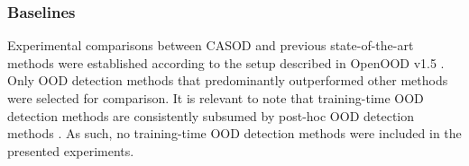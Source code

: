 %
%	
\subsubsection{Baselines}
Experimental comparisons between CASOD and previous state-of-the-art methods were established according to the setup described in OpenOOD v1.5 \cite{zhang2023openood}. Only OOD detection methods that predominantly outperformed other methods were selected for comparison. It is relevant to note that training-time OOD detection methods are consistently subsumed by post-hoc OOD detection methods \cite{zhang2023openood,yang2024generalized}. As such, no training-time OOD detection methods were included in the presented experiments.

